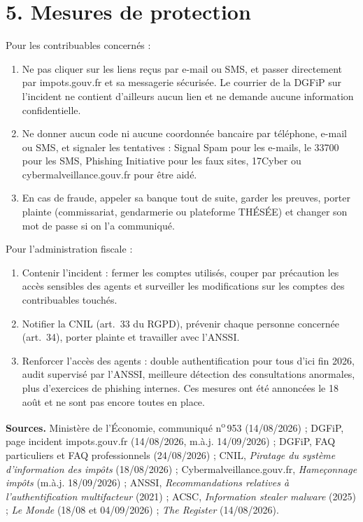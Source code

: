 \documentclass[10pt,a4paper]{article}
\begin{document}
\section{5. Mesures de protection}
Pour les contribuables concernés :
\begin{enumerate}
  \item Ne pas cliquer sur les liens reçus par e-mail ou SMS, et passer directement par impots.gouv.fr et sa messagerie sécurisée. Le courrier de la DGFiP sur l'incident ne contient d'ailleurs aucun lien et ne demande aucune information confidentielle.
  \item Ne donner aucun code ni aucune coordonnée bancaire par téléphone, e-mail ou SMS, et signaler les tentatives : Signal Spam pour les e-mails, le 33700 pour les SMS, Phishing Initiative pour les faux sites, 17Cyber ou cybermalveillance.gouv.fr pour être aidé.
  \item En cas de fraude, appeler sa banque tout de suite, garder les preuves, porter plainte (commissariat, gendarmerie ou plateforme THÉSÉE) et changer son mot de passe si on l'a communiqué.
\end{enumerate}
Pour l'administration fiscale :
\begin{enumerate}
  \item Contenir l'incident : fermer les comptes utilisés, couper par précaution les accès sensibles des agents et surveiller les modifications sur les comptes des contribuables touchés.
  \item Notifier la CNIL (art.~33 du RGPD), prévenir chaque personne concernée (art.~34), porter plainte et travailler avec l'ANSSI.
  \item Renforcer l'accès des agents : double authentification pour tous d'ici fin 2026, audit supervisé par l'ANSSI, meilleure détection des consultations anormales, plus d'exercices de phishing internes. Ces mesures ont été annoncées le 18 août et ne sont pas encore toutes en place.
\end{enumerate}

\vfill
{\scriptsize
\textbf{Sources.} Ministère de l'Économie, communiqué n\textsuperscript{o}\,953 (14/08/2026) ; DGFiP, page incident impots.gouv.fr (14/08/2026, m.à.j. 14/09/2026) ; DGFiP, FAQ particuliers et FAQ professionnels (24/08/2026) ; CNIL, \emph{Piratage du système d'information des impôts} (18/08/2026) ; Cybermalveillance.gouv.fr, \emph{Hameçonnage impôts} (m.à.j. 18/09/2026) ; ANSSI, \emph{Recommandations relatives à l'authentification multifacteur} (2021) ; ACSC, \emph{Information stealer malware} (2025) ; \emph{Le Monde} (18/08 et 04/09/2026) ; \emph{The Register} (14/08/2026).
}
\end{document}
